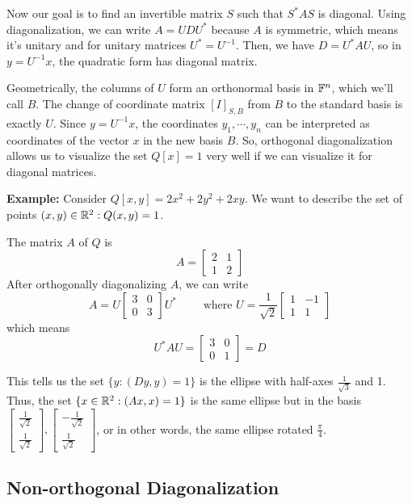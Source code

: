 Now our goal is to find an invertible matrix $S$ such that $S^{*} AS$ is diagonal. Using diagonalization, we can write $A = UDU^{*}$ because $A$ is symmetric, which means it's unitary and for unitary matrices $U^{*} = U^{-1}$. Then, we have $D = U^{*} AU$, so in $y = U^{-1} x$, the quadratic form has diagonal matrix. 

Geometrically, the columns of $U$ form an orthonormal basis in $\mathbb{F}^{n}$, which we'll call $B$. The change of coordinate matrix $[I]_{S, B}$ from $B$ to the standard basis is exactly $U$. Since $y = U^{-1} x$, the coordinates $y_{1}, \cdots, y_{n}$ can be interpreted as coordinates of the vector $x$ in the new basis $B$. So, orthogonal diagonalization allows us to visualize the set $Q[x] = 1$ very well if we can visualize it for diagonal matrices. 

\textbf{Example:} Consider $Q[x, y] = 2x^{2} + 2y^{2} + 2xy$. We want to describe the set of points $(x, y) \in \mathbb{R}^{2} : Q(x, y) = 1$. 

The matrix $A$ of $Q$ is 
$$A = \begin{bmatrix}
2 & 1 \\
1 & 2
\end{bmatrix}$$ 
After orthogonally diagonalizing $A$, we can write 
$$A = U \begin{bmatrix}
3 & 0 \\
0 & 3
\end{bmatrix} U^{*} \qquad \text{ where } U = \frac{1}{\sqrt{2}} \begin{bmatrix}
1 & -1 \\
1 & 1
\end{bmatrix}$$
which means
$$U^{*} AU = \begin{bmatrix}
3 & 0 \\
0 & 1
\end{bmatrix} = D$$

This tells us the set $\{y : (Dy, y) = 1\}$ is the ellipse with half-axes $\frac{1}{\sqrt{3}}$ and 1. Thus, the set $\{x \in \mathbb{R}^{2}: (Ax, x) = 1 \}$ is the same ellipse but in the basis $\begin{bmatrix}
\frac{1}{\sqrt{2}} \\
\frac{1}{\sqrt{2}}
\end{bmatrix}, \begin{bmatrix}
-\frac{1}{\sqrt{2}} \\
\frac{1}{\sqrt{2}}
\end{bmatrix}$, or in other words, the same ellipse rotated $\frac{\pi}{4}$. 

\subsection{Non-orthogonal Diagonalization} 

